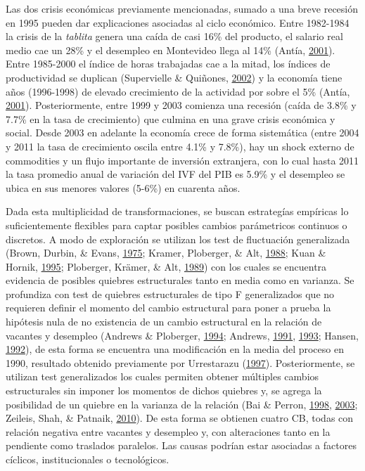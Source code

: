 \documentclass[12pt,oneside]{reedthesis}
\begin{document}
Las dos crisis económicas previamente mencionadas, sumado a una breve recesión en 1995 pueden dar explicaciones asociadas al ciclo económico. Entre 1982-1984 la crisis de la \emph{tablita} genera una caída de casi 16\% del producto, el salario real medio cae un 28\% y el desempleo en Montevideo llega al 14\% (Antía, \protect\hyperlink{ref-Antia2001}{2001}). Entre 1985-2000 el índice de horas trabajadas cae a la mitad, los índices de productividad se duplican (Supervielle \& Quiñones, \protect\hyperlink{ref-Quinones2001}{2002}) y la economía tiene años (1996-1998) de elevado crecimiento de la actividad por sobre el 5\% (Antía, \protect\hyperlink{ref-Antia2001}{2001}). Posteriormente, entre 1999 y 2003 comienza una recesión (caída de 3.8\% y 7.7\% en la tasa de crecimiento) que culmina en una grave crisis económica y social. Desde 2003 en adelante la economía crece de forma sistemática (entre 2004 y 2011 la tasa de crecimiento oscila entre 4.1\% y 7.8\%), hay un shock externo de commodities y un flujo importante de inversión extranjera, con lo cual hasta 2011 la tasa promedio anual de variación del IVF del PIB es 5.9\% y el desempleo se ubica en sus menores valores (5-6\%) en cuarenta años.

Dada esta multiplicidad de transformaciones, se buscan estrategías empíricas lo suficientemente flexibles para captar posibles cambios parámetricos continuos o discretos. A modo de exploración se utilizan los test de fluctuación generalizada (Brown, Durbin, \& Evans, \protect\hyperlink{ref-Brown1975}{1975}; Kramer, Ploberger, \& Alt, \protect\hyperlink{ref-Society1988}{1988}; Kuan \& Hornik, \protect\hyperlink{ref-Kuan1995}{1995}; Ploberger, Krämer, \& Alt, \protect\hyperlink{ref-Ploberger1989}{1989}) con los cuales se encuentra evidencia de posibles quiebres estructurales tanto en media como en varianza. Se profundiza con test de quiebres estructurales de tipo F generalizados que no requieren definir el momento del cambio estructural para poner a prueba la hipótesis nula de no existencia de un cambio estructural en la relación de vacantes y desempleo (Andrews \& Ploberger, \protect\hyperlink{ref-Andrews1994}{1994}; Andrews, \protect\hyperlink{ref-Andrews1991}{1991}, \protect\hyperlink{ref-Andrews1993}{1993}; Hansen, \protect\hyperlink{ref-Hansen1992}{1992}), de esta forma se encuentra una modificación en la media del proceso en 1990, resultado obtenido previamente por Urrestarazu (\protect\hyperlink{ref-Urrestarazu1997}{1997}). Posteriormente, se utilizan test generalizados los cuales permiten obtener múltiples cambios estructurales sin imponer los momentos de dichos quiebres y, se agrega la posibilidad de un quiebre en la varianza de la relación (Bai \& Perron, \protect\hyperlink{ref-BaiPerron1998}{1998}, \protect\hyperlink{ref-BaiPerron2003}{2003}; Zeileis, Shah, \& Patnaik, \protect\hyperlink{ref-Zeileis2010}{2010}). De esta forma se obtienen cuatro CB, todas con relación negativa entre vacantes y desempleo y, con alteraciones tanto en la pendiente como traslados paralelos. Las causas podrían estar asociadas a factores cíclicos, institucionales o tecnológicos.
\end{document}
